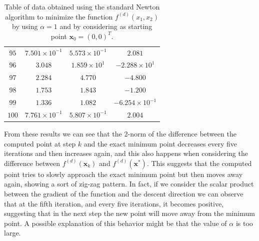 \documentclass[a4paper,11pt]{article}
\begin{document}
\begin{table}[H]
\begin{tabular}{|c|c|c|c|}
		$95$ & $7.501\times10^{-1}$ & $5.573\times10^{-1}$ & $2.081$ \\
		$96$ & $3.048$ & $1.859\times10^{1}$ & $-2.288\times10^{1}$ \\
		$97$ & $2.284$ & $4.770$ & $-4.800$ \\
		$98$ & $1.753$ & $1.843$ & $-1.200$ \\
		$99$ & $1.336$ & $1.082$ & $-6.254\times10^{-1}$ \\
		$100$ & $7.761\times10^{-1}$ & $5.807\times10^{-1}$ & $2.004$ \\
		\hline
	\end{tabular}
	\caption{Table of data obtained using the standard Newton algorithm to minimize the function $f^{(d)}(x_{1},x_{2})$ by using $\alpha=1$ and by considering as starting point $\textbf{x}_{0}=(0,0)^{T}$.}
	\label{tab:func_d_x0_2}
\end{table}
\noindent From these results we can see that the 2-norm of the difference between the computed point at step $k$ and the exact minimum point decreases every five iterations and then increases again, and this also happens when considering the difference between $f^{(d)}(\textbf{x}_{k})$ and  $f^{(d)}(\textbf{x}^*)$. This suggests that the computed point tries to slowly approach the exact minimum point but then moves away again, showing a sort of zig-zag pattern. In fact, if we consider the scalar product between the gradient of the function and the descent direction we can observe that at the fifth iteration, and every five iterations, it becomes positive, suggesting that in the next step the new point will move away from the minimum point. A possible explanation of this behavior might be that the value of $\alpha$ is too large.\\
\end{document}
